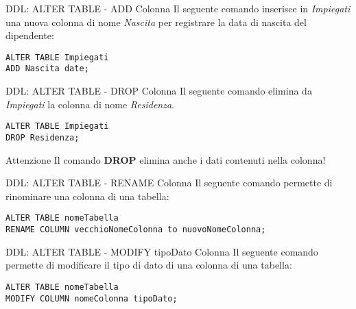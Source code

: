 %
\begin{frame}[fragile]{DDL: ALTER TABLE - ADD Colonna}
Il seguente comando inserisce in \textit{Impiegati} una nuova colonna di nome \textit{Nascita} per registrare la data di nascita del dipendente:
\begin{lstlisting}
ALTER TABLE Impiegati
ADD Nascita date;
\end{lstlisting}
\end{frame}
%
\begin{frame}[fragile]{DDL: ALTER TABLE - DROP Colonna}
Il seguente comando elimina da \textit{Impiegati} la colonna di nome \textit{Residenza}.
\begin{lstlisting}
ALTER TABLE Impiegati
DROP Residenza;
\end{lstlisting}
\begin{minipage}{0.7\textwidth}
    \begin{alertblock}{Attenzione}
        Il comando \textbf{DROP} elimina anche i dati contenuti nella colonna!
    \end{alertblock}
\end{minipage}
\end{frame}
%
\begin{frame}[fragile]{DDL: ALTER TABLE - RENAME Colonna}
Il seguente comando permette di rinominare una colonna di una tabella:
\begin{lstlisting}
ALTER TABLE nomeTabella
RENAME COLUMN vecchioNomeColonna to nuovoNomeColonna;
\end{lstlisting}
\end{frame}
%
\begin{frame}[fragile]{DDL: ALTER TABLE - MODIFY tipoDato Colonna}
Il seguente comando permette di modificare il tipo di dato di una colonna di una tabella:
\begin{lstlisting}
ALTER TABLE nomeTabella
MODIFY COLUMN nomeColonna tipoDato;
\end{lstlisting}
\end{frame}